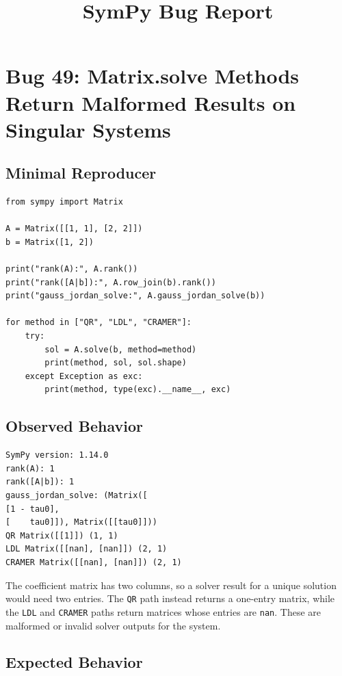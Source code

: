 \documentclass[11pt]{article}
\title{SymPy Bug Report}
\author{}
\date{}
\begin{document}
\maketitle

\section{Bug 49: Matrix.solve Methods Return Malformed Results on Singular Systems}

\subsection{Minimal Reproducer}

\medskip

\begin{lstlisting}[style=bugpython]
from sympy import Matrix

A = Matrix([[1, 1], [2, 2]])
b = Matrix([1, 2])

print("rank(A):", A.rank())
print("rank([A|b]):", A.row_join(b).rank())
print("gauss_jordan_solve:", A.gauss_jordan_solve(b))

for method in ["QR", "LDL", "CRAMER"]:
    try:
        sol = A.solve(b, method=method)
        print(method, sol, sol.shape)
    except Exception as exc:
        print(method, type(exc).__name__, exc)
\end{lstlisting}

\subsection{Observed Behavior}

\medskip

\begin{lstlisting}[style=bugpython]
SymPy version: 1.14.0
rank(A): 1
rank([A|b]): 1
gauss_jordan_solve: (Matrix([
[1 - tau0],
[    tau0]]), Matrix([[tau0]]))
QR Matrix([[1]]) (1, 1)
LDL Matrix([[nan], [nan]]) (2, 1)
CRAMER Matrix([[nan], [nan]]) (2, 1)
\end{lstlisting}

The coefficient matrix has two columns, so a solver result for a unique solution would need two entries. The \texttt{QR} path instead returns a one-entry matrix, while the \texttt{LDL} and \texttt{CRAMER} paths return matrices whose entries are \texttt{nan}. These are malformed or invalid solver outputs for the system.

\subsection{Expected Behavior}
\end{document}

